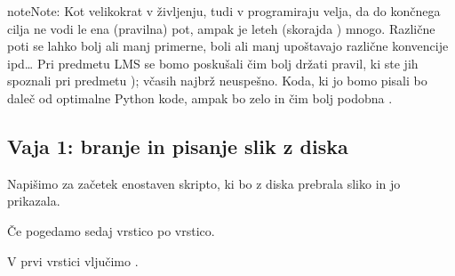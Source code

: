 \documentclass[letterpaper,10pt,english]{sphinxmanual}
\begin{document}
\begin{sphinxadmonition}{note}{Note:}
\sphinxAtStartPar
Kot velikokrat v življenju, tudi v programiraju velja, da do končnega cilja ne vodi le ena (pravilna) pot, ampak je le\sphinxhyphen{}teh (skorajda ) mnogo. Različne poti se lahko bolj ali manj primerne, boli ali manj upoštavajo različne konvencije ipd… Pri predmetu LMS se bomo poskušali čim bolj držati pravil, ki ste jih spoznali pri predmetu ); včasih najbrž neuspešno. Koda, ki jo bomo pisali bo daleč od optimalne Python kode, ampak bo zelo  in čim bolj podobna .
\end{sphinxadmonition}


\subsection{Vaja 1: branje in pisanje slik z diska}
\label{\detokenize{uvod_py_opencv:vaja-1-branje-in-pisanje-slik-z-diska}}
\sphinxAtStartPar
Napišimo za začetek enostaven  skripto, ki bo z diska prebrala sliko in jo prikazala.

\begin{sphinxVerbatim}[commandchars=\\\{\},numbers=left,firstnumber=1,stepnumber=1]
 

  
 

\end{sphinxVerbatim}

\sphinxAtStartPar
Če pogedamo sedaj vrstico po vrstico.

\begin{sphinxVerbatim}[commandchars=\\\{\}]
 
\end{sphinxVerbatim}

\sphinxAtStartPar
V prvi vrstici vljučimo .
\end{document}
